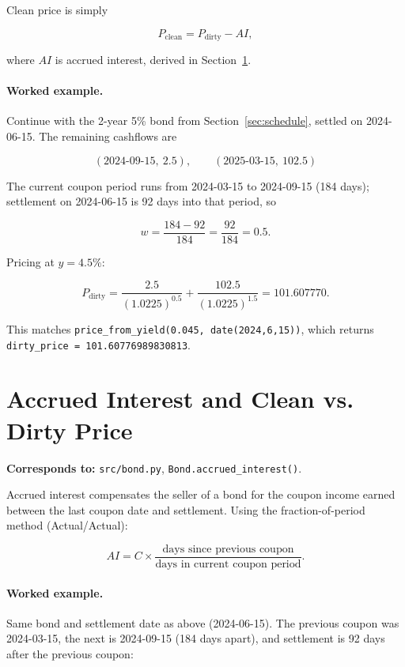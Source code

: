 \documentclass[11pt]{article}
\begin{document}
Clean price is simply

\begin{equation}
  P_{\text{clean}} = P_{\text{dirty}} - AI,
  \label{eq:clean-price}
\end{equation}

where $AI$ is accrued interest, derived in Section~\ref{sec:accrued}.

\paragraph{Worked example.} Continue with the 2-year 5\% bond from Section~\ref{sec:schedule},
settled on 2024-06-15. The remaining cashflows are

\[
  (2024\text{-}09\text{-}15,\ 2.5), \qquad (2025\text{-}03\text{-}15,\ 102.5)
\]

The current coupon period runs from 2024-03-15 to 2024-09-15 (184 days); settlement on
2024-06-15 is 92 days into that period, so

\[
  w = \frac{184 - 92}{184} = \frac{92}{184} = 0.5.
\]

Pricing at $y = 4.5\%$:

\[
  P_{\text{dirty}} = \frac{2.5}{(1.0225)^{0.5}} + \frac{102.5}{(1.0225)^{1.5}} = 101.607770.
\]

This matches \texttt{price\_from\_yield(0.045, date(2024,6,15))}, which returns
\texttt{dirty\_price = 101.60776989830813}.

\section{Accrued Interest and Clean vs. Dirty Price}
\label{sec:accrued}

\textbf{Corresponds to:} \texttt{src/bond.py}, \texttt{Bond.accrued\_interest()}.

Accrued interest compensates the seller of a bond for the coupon income earned between the
last coupon date and settlement. Using the fraction-of-period method (Actual/Actual):

\begin{equation}
  AI = C \times \frac{\text{days since previous coupon}}{\text{days in current coupon period}}.
  \label{eq:accrued}
\end{equation}

\paragraph{Worked example.} Same bond and settlement date as above (2024-06-15). The previous
coupon was 2024-03-15, the next is 2024-09-15 (184 days apart), and settlement is 92 days
after the previous coupon:
\end{document}
